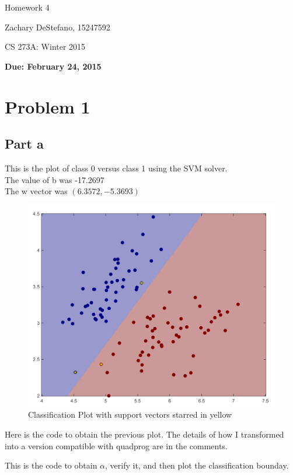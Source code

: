 \documentclass[twoside,11pt]{article}
\theoremstyle{definition}
\begin{document}
\centerline{\Large Homework 4}
\centerline{Zachary DeStefano, 15247592}
\centerline{CS 273A: Winter 2015}
\centerline{\bf Due: February 24, 2015}

\section*{Problem 1}

\subsection*{Part a}

This is the plot of class 0 versus class 1 using the SVM solver.\\
The value of b was -17.2697\\
The w vector was $(6.3572,-5.3693)$\\

\begin{figure}[h]
\centering
\includegraphics[width=6 in]{prob1Plot1.png}
\caption{Classification Plot with support vectors starred in yellow}
\end{figure}
\newpage
Here is the code to obtain the previous plot. The details of how I transformed into a version compatible with quadprog are in the comments. 


\newpage

This is the code to obtain $\alpha$, verify it, and then plot the classification bounday. 

\end{document}
